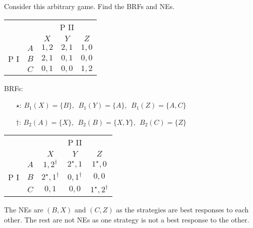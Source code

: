\documentclass[12pt,letterpaper]{report}
\begin{document}
\begin{ex}
  Consider this arbitrary game.
  Find the BRFs and NEs.

  \begin{center}
    \renewcommand{\arraystretch}{1.25}
    \begin{tabular}{c c |c|c|c|}
      \multicolumn{2}{c}{} & \multicolumn{3}{c}{P II} \\
      \multicolumn{2}{c}{} & \multicolumn{1}{c}{$X$} & \multicolumn{1}{c}{$Y$}
        & \multicolumn{1}{c}{$Z$} \\
      \cline{3-5}
      \multirow{3}{*}{P I} & $A$ & $1, 2$ & $2, 1$ & $1, 0$ \\
      \cline{3-5}
      & $B$ & $2, 1$ & $0, 1$ & $0, 0$ \\
      \cline{3-5}
      & $C$ & $0, 1$ & $0, 0$ & $1, 2$ \\
      \cline{3-5}
    \end{tabular}
  \end{center}

  BRFs:
  \begin{itemize}
    \item[$\star$:] $B_1(X) = \{ B \}, \ \ B_1(Y) = \{ A \}, \ \ B_1(Z) = \{ A, C \}$
    \item[$\dagger$:] $B_2(A) = \{ X \}, \ \ B_2(B) = \{ X, Y \}, \ \ B_2(C) = \{ Z \}$
  \end{itemize}

  \begin{center}
    \renewcommand{\arraystretch}{1.25}
    \begin{tabular}{c c |c|c|c|}
      \multicolumn{2}{c}{} & \multicolumn{3}{c}{P II} \\
      \multicolumn{2}{c}{} & \multicolumn{1}{c}{$X$} & \multicolumn{1}{c}{$Y$}
        & \multicolumn{1}{c}{$Z$} \\
      \cline{3-5}
      \multirow{3}{*}{P I} & $A$ & $1, 2^\dagger$ & $2^\star, 1$ & $1^\star, 0$ \\
      \cline{3-5}
      & $B$ & $2^\star, 1^\dagger$ & $0, 1^\dagger$ & $0, 0$ \\
      \cline{3-5}
      & $C$ & $0, 1$ & $0, 0$ & $1^\star, 2^\dagger$ \\
      \cline{3-5}
    \end{tabular}
  \end{center}

  The NEs are $(B, X)$ and $(C, Z)$ as the strategies are best responses to each other.
  The rest are not NEs as one strategy is not a best response to the other.
\end{ex}
\end{document}
